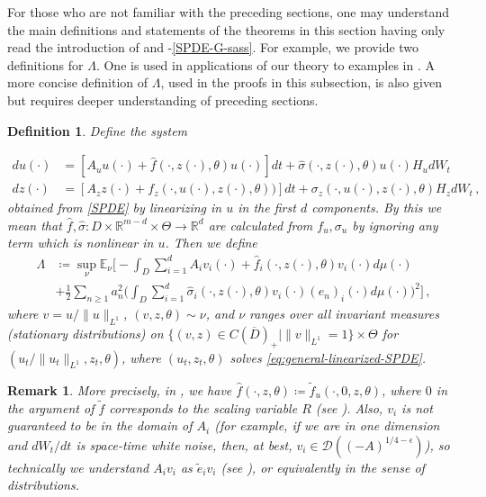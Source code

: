 \documentclass[final]{amsart}
\newtheorem{deff}[thm]{Definition}
\newtheorem{rem}[thm]{Remark}
\numberwithin{thm}{section}
\numberwithin{equation}{section}
\newcommand{\E}{\mathbb{E}}
\newcommand{\R}{\mathbb{R}}
\newcommand{\Dm}{\mathcal{D}}
\newcommand{\cdom}{C(\overline D)_+}
\begin{document}
For those who are not familiar with the preceding sections, one may understand the main definitions and statements of the theorems in this section having only read the introduction of  and -\ref{SPDE-G-sass}. For example, we provide two definitions for $\Lambda$. One is used in applications of our theory to examples in . A more concise definition of $\Lambda$, used in the proofs in this subsection, is also given but  requires deeper understanding of preceding sections.
\begin{deff}\label{def:equiv-lambda-def}
 Define the system
 
\begin{equation}\label{eq:general-linearized-SPDE}
    \begin{aligned}
        du(\cdot) &= [A_uu(\cdot) + \hat f(\cdot,z(\cdot),\theta)u(\cdot)]dt + \hat \sigma(\cdot,z(\cdot),\theta)u(\cdot)H_udW_t \\
        dz(\cdot) &= [A_zz(\cdot) + f_z(\cdot,u(\cdot),z(\cdot),\theta))]dt + \sigma_z(\cdot,u(\cdot),z(\cdot),\theta)H_zdW_t \,,
    \end{aligned}
\end{equation}
obtained from \eqref{SPDE} by linearizing in $u$ in the first $d$ components. By this we mean that $\hat f,\hat \sigma: D \times \R^{m-d} \times \Theta \to \R^d$ are calculated from $f_u,\sigma_u$ by ignoring any term which is nonlinear in $u$. Then we define
\begin{equation}\label{eq:lambda-alternative}
\begin{aligned}
    \Lambda &\coloneqq \sup_\nu \E_\nu\Big[-\int_D \sum_{i=1}^d A_iv_i(\cdot) + \hat f_i(\cdot,z(\cdot),\theta)v_i(\cdot) d\mu(\cdot)\\
    &+ \frac{1}{2}\sum_{n \geq 1} a_n^2\Big(\int_D \sum_{i=1}^d\hat \sigma_i(\cdot,z(\cdot),
    \theta)v_i(\cdot)(e_n)_i(\cdot)d\mu(\cdot)\Big)^2\Big] \,,
\end{aligned}
\end{equation}
where $v = u/\|u\|_{L^1}$, $(v,z,\theta) \sim \nu$, and $\nu$ ranges over all invariant measures (stationary distributions) on $\{(v,z) \in \cdom \mid \|v\|_{L^1} = 1\} \times \Theta$ for $(u_t/\|u_t\|_{L^1},z_t,\theta)$, where $(u_t,z_t,\theta)$ solves \eqref{eq:general-linearized-SPDE}.
\end{deff}
\begin{rem}\label{rem:explain-lambda-equiv}
More precisely, in , we have $\hat f(\cdot,z,\theta) \coloneqq \tilde f_u(\cdot,0,z,\theta)$, where $0$ in the argument of $\tilde{f}$ corresponds to the scaling variable $R$ 
(see ). Also, $v_i$ is not guaranteed to be in the domain of $A_i$ (for example, if we are in one dimension and $dW_t/dt$ is space-time white noise, then, at best, $v_i \in \Dm((-A)^{1/4-\epsilon})$), so technically we understand $A_iv_i$ as $\tilde e_iv_i$ (see ), or equivalently in the sense of distributions. 
\end{rem}
\end{document}
